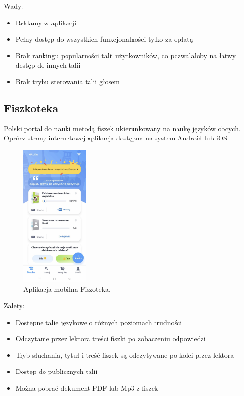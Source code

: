 Wady:
\begin{itemize}
    \item Reklamy w aplikacji
    \item Pełny dostęp do wszystkich funkcjonalności tylko za opłatą
    \item Brak rankingu popularności talii użytkowników, co pozwalałoby na łatwy dostęp do innych talii
    \item Brak trybu sterowania talii głosem
\end{itemize}

\subsection{Fiszkoteka}

Polski portal do nauki metodą fiszek ukierunkowany na naukę języków obcych. Oprócz strony internetowej aplikacja dostępna na system Android lub iOS.

\begin{figure}[H]
    \centering
    \includegraphics[width=0.3\textwidth]{chapters/chapter_3/fiszoteka.png}
    \caption{Aplikacja mobilna Fiszoteka.}
    \label{img:fiszoteka}
\end{figure}

Zalety:
\begin{itemize}
    \item Dostępne talie językowe o różnych poziomach trudności
    \item Odczytanie przez lektora treści fiszki po zobaczeniu odpowiedzi
    \item Tryb słuchania, tytuł i treść fiszek są odczytywane po kolei przez lektora
    \item Dostęp do publicznych talii
    \item Można pobrać dokument PDF lub Mp3 z fiszek
\end{itemize}

